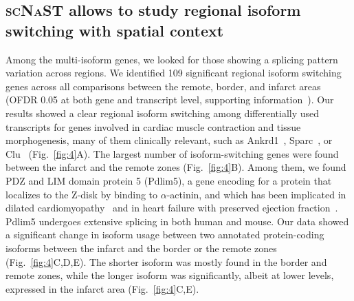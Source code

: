 \documentclass[utf8]{FrontiersinHarvard} %
\newcommand{\scnast}{\textsc{scNaST}\xspace}
\begin{document}
\subsection*{\scnast allows to study regional isoform switching with spatial context}
Among the multi-isoform genes, we looked for those showing a splicing pattern variation across regions.
We identified 109 significant regional isoform switching genes across all comparisons between the remote, border, and infarct areas (OFDR 0.05 at both gene and transcript level, supporting information~).
Our results showed a clear regional isoform switching among differentially used transcripts for genes involved in cardiac muscle contraction and tissue morphogenesis, many of them clinically relevant, such as Ankrd1~\citep{Mikhailov2008:Ankrd1}, Sparc~\citep{McCurdy2011:Sparc}, or Clu~\citep{Turkieh2019:Clu} (Fig.~\ref{fig:4}A).
The largest number of isoform-switching genes were found between the infarct and the remote zones (Fig.~\ref{fig:4}B).
Among them, we found PDZ and LIM domain protein 5 (Pdlim5), a gene encoding for a protein that localizes to the Z-disk by binding to $\alpha$-actinin, and which has been implicated in dilated cardiomyopathy~\citep{Verdonschot2020:Pdlim5} and in heart failure with preserved ejection fraction~\citep{Soetkamp2021:PKC_HFpEF}.
Pdlim5 undergoes extensive splicing in both human and mouse.
Our data showed a significant change in isoform usage between two annotated protein-coding isoforms between the infarct and the border or the remote zones (Fig.~\ref{fig:4}C,D,E).
The shorter isoform was mostly found in the border and remote zones, while the longer isoform was significantly, albeit at lower levels, expressed in the infarct area (Fig.~\ref{fig:4}C,E).
\end{document}
